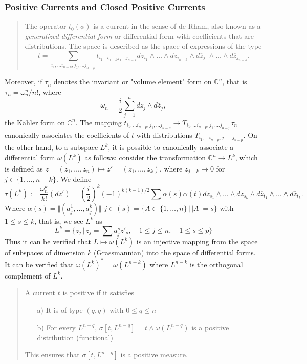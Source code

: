 \documentclass[12pt,twoside,a4paper]{report}
\begin{document}
\subsubsection{Positive Currents and Closed Positive Currents}
\label{sec:org61c3412}
\begin{quote}
The operator $t_0(\phi)$ is a current in the sense of de Rham, also known as a \emph{generalized differential form} or differential form with coefficients that are distributions. The space is described as the space of expressions of the type
\[
    t=\sum_{i_1,\dots i_{n-p},j_1,\dots j_{n-p}}t_{i_1\dots i_{n-k}j_1\dots j_{n-k}} dz_{i_1}\wedge\dots\wedge dz_{i_{n-k}}\wedge d\overline{z}_{j_1}\wedge\dots\wedge d\overline{z}_{j_{n-k}}.
\]
\end{quote}
Moreover, if $\tau_n$ denotes the invariant or "volume element" form on $\mathbb{C}^n$, that is $\tau_n=\omega_n^n/n!$, where
\[
    \omega_n=\frac{i}{2}\sum_{j=1}^n dz_j\wedge d\overline{z}_j,
\]
the Kähler form on $\mathbb{C}^n$. The mapping $t_{i_1,\dots i_{n-p},j_1,\dots j_{n-p}}\rightarrow T_{i_1,\dots i_{n-p},j_1,\dots j_{n-p}}\tau_n$ canonically associates the coefficients of $t$ with distributions $T_{i_1,\dots i_{n-p},j_1,\dots j_{n-p}}$. On the other hand, to a subspace $L^k$,
\noindent it is possible to canonically associate a differential form $\omega(L^k)$ as follows: consider the transformation $\mathbb{C}^n\rightarrow L^k$, which is defined as $z=(z_1,\dots,z_n)\mapsto z'=(z_1,\dots,z_k)$, where $z_{j+k}\mapsto 0$ for $j\in\{1,\dots,n-k\}$. We define
\[
    \tau(L^k):=\frac{\omega_n^k}{k!}(dz')=(\frac{i}{2})^k(-1)^{k(k-1)/2}\sum \alpha(s)\overline{\alpha(t)}dz_{s_1}\wedge\dots\wedge dz_{s_k}\wedge d\overline{z}_{t_1}\wedge \dots\wedge d\overline{z}_{t_k}.
\]
Where $\alpha(s)=\Vert(a^{1}_{j},\dots,a^{k}_{j})\Vert$ $j\in(s)=\{A\subset\{1,\dots,n\}\,\vert\, |A|=s\}$ with $1\leq s\leq k$, that is, we see $L^k$ as
\[
    L^k=\{z_j\,\vert\,z_j=\sum a^{s}_{j}z'_s,\quad 1\leq j\leq n,\quad 1\leq s\leq p \}
\]
Thus it can be verified that $L\mapsto\omega(L^k)$ is an injective mapping from the space of subspaces of dimension $k$ (Grassmannian) into the space of differential forms. It can be verified that $\omega(L^k)^{*}=\omega(L^{n-k})$ where $L^{n-k}$ is the orthogonal complement of $L^k$.
\begin{quote}
\begin{def.}
    A current $t$ is positive if it satisfies
    \begin{itemize}
        \item[a)] It is of type $(q,q)$ with $0\leq q\leq n$
        \item[b)] For every $L^{n-q}$, $\sigma[t,L^{n-q}]=t\wedge\omega(L^{n-q})$ is a positive distribution (functional)
    \end{itemize}
    This ensures that $\sigma[t,L^{n-q}]$ is a positive measure.
\end{def.}
\end{quote}
\end{document}
